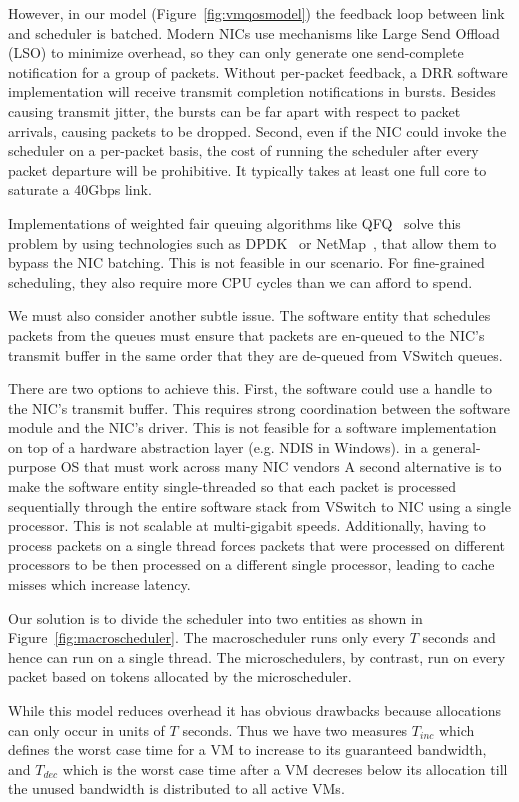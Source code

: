 However, in our model  (Figure~\ref{fig:vmqosmodel}) the feedback loop between
link and scheduler is batched.  Modern NICs use mechanisms like Large Send
Offload (LSO) to minimize overhead, so they can only generate one send-complete
notification for a group of packets.  Without per-packet feedback, a DRR
software implementation will receive transmit completion notifications in
bursts.  Besides causing transmit jitter, the bursts can be far apart with
respect to packet arrivals, causing packets to be dropped. Second, even if the
NIC could invoke the scheduler on a per-packet basis, the cost of running the
scheduler after every packet departure will be prohibitive. It typically takes
at least one full core to saturate a 40Gbps link. 

Implementations of weighted fair queuing algorithms like QFQ~\cite{qfq} solve
this problem by using technologies such as DPDK~\cite{dpdk} or
NetMap~\cite{netmap}, that allow them to bypass the NIC batching.  This is not
feasible in our scenario. For fine-grained scheduling, they also require more
CPU cycles than we can afford to spend.
 
We must also consider another subtle issue.  The software entity that
schedules packets from the queues must ensure that packets are en-queued to the
NIC's transmit buffer in the same order that they are de-queued from VSwitch
queues.  

There are two options to achieve this. First, the software could use a handle to
the NIC's transmit buffer.  This requires strong coordination between the
software module and the NIC's driver.  This is not feasible for a software
implementation on top of a hardware abstraction layer (e.g. NDIS in Windows).
in a general-purpose OS that must work across many NIC vendors A second
alternative is to make the software entity single-threaded so that each packet
is processed sequentially through the entire software stack from VSwitch to NIC
using a single processor. This is not scalable at multi-gigabit speeds.
Additionally, having to process packets on a single thread forces packets that
were processed on different processors to be then processed on a different
single processor, leading to cache misses which increase latency.

Our solution is to divide the scheduler into two entities as shown in
Figure~\ref{fig:macroscheduler}.   The macroscheduler runs only every $T$
seconds and hence can run on a single thread.   The microschedulers, by
contrast, run on every packet based on tokens allocated by the microscheduler.   

While this model reduces overhead it has obvious drawbacks because allocations
can only occur in units of $T$ seconds.   Thus we have two measures $T_{inc}$
which defines the worst case time for a VM to increase to its guaranteed
bandwidth, and $T_{dec}$ which is the worst case time after a VM decreses below
its allocation till the unused bandwidth is distributed to all active VMs. 
